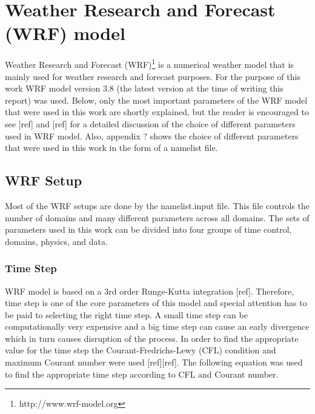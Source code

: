 \documentclass[a4paper,12pt]{article}
\numberwithin{equation}{section} %
\begin{document}
\section{Weather Research and Forecast (WRF) model}

Weather Research and Forecast (WRF)\footnote{http://www.wrf-model.org} is a numerical weather model that is mainly used for weather research and forecast purposes.
For the purpose of this work WRF model version 3.8 (the latest version at the time of writing this report) was used. Below, only the most important parameters of the WRF model that were used in this work are shortly explained, but the reader is encouraged to see [ref] and [ref] for a detailed discussion of the choice of different parameters used in WRF model. Also, appendix ? shows the choice of different parameters that were used in this work in the form of a namelist file. 



\subsection{WRF Setup}

Most of the WRF setups are done by the namelist.input file. This file controls the number of domains and many different parameters across all domains. The sets of parameters used in this work can be divided into four groups of time control, domains, physics, and data.

\subsubsection{Time Step}

WRF model is based on a 3rd order Runge-Kutta integration [ref]. Therefore, time step is one of the core parameters of this model and special attention has to be paid to selecting the right time step. A small time step can be computationally very expensive and a big time step can cause an early divergence which in turn causes disruption of the process. In order to find the appropriate value for the time step the Courant-Fredrichs-Lewy (CFL) condition and maximum Courant number were used [ref][ref]. The following equation was used to find the appropriate time step according to CFL and Courant number.
\end{document}
